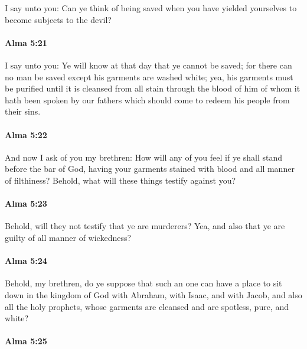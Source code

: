 			I say unto you:
			Can ye think of being saved
			when you have yielded yourselves to become subjects to the devil?

		\paragraph{Alma 5:21} %
			\label{ALMA-5-21}

			I say unto you:
			Ye will know at that day that ye cannot be saved;
			for there can no man be saved except his garments are washed white;
			yea, his garments must be purified until it is cleansed from all stain
			through the blood of him of whom it hath been spoken by our fathers
			which should come to redeem his people from their sins.

		\paragraph{Alma 5:22} %
			\label{ALMA-5-22}

			And now I ask of you my brethren:
			How will any of you feel if ye shall stand before the bar of God,
			having your garments stained with blood and all manner of filthiness?
			Behold, what will these things testify against you?

		\paragraph{Alma 5:23} %
			\label{ALMA-5-23}

			Behold, will they not testify that ye are murderers?
			Yea, and also that ye are guilty of all manner of wickedness?

		\paragraph{Alma 5:24} %
			\label{ALMA-5-24}

			Behold, my brethren, do ye suppose
			that such an one can have a place to sit down in the kingdom of God
			with Abraham, with Isaac, and with Jacob, and also all the holy prophets,
			whose garments are cleansed and are spotless, pure, and white?

		\paragraph{Alma 5:25} %
			\label{ALMA-5-25}

